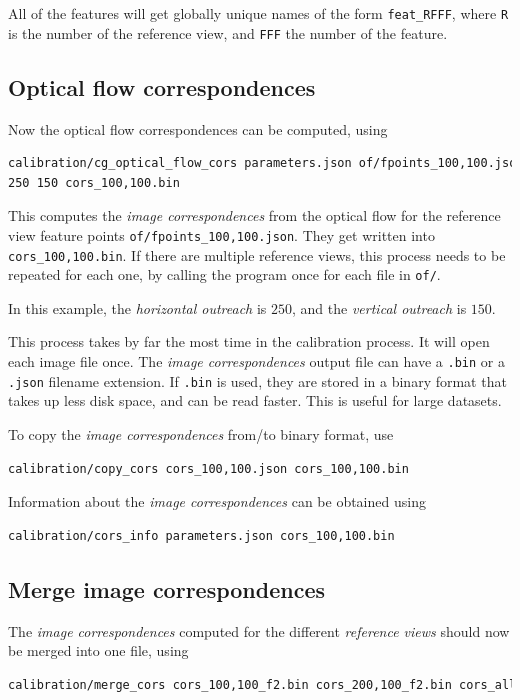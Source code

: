 \documentclass[11pt]{scrreprt}
\begin{document}
All of the features will get globally unique names of the form \texttt{feat\_RFFF}, where \texttt{R} is the number of the reference view, and \texttt{FFF} the number of the feature.

\subsection{Optical flow correspondences}
Now the optical flow correspondences can be computed, using
\begin{lstlisting}[language=bash]
calibration/cg_optical_flow_cors parameters.json of/fpoints_100,100.json
250 150 cors_100,100.bin
\end{lstlisting}
This computes the \emph{image correspondences} from the optical flow for the reference view feature points \texttt{of/fpoints\_100,100.json}. They get written into \texttt{cors\_100,100.bin}. If there are multiple reference views, this process needs to be repeated for each one, by calling the program once for each file in \texttt{of/}.

In this example, the \emph{horizontal outreach} is $250$, and the \emph{vertical outreach} is $150$.

This process takes by far the most time in the calibration process. It will open each image file once. The \emph{image correspondences} output file can have a \texttt{.bin} or a \texttt{.json} filename extension. If \texttt{.bin} is used, they are stored in a binary format that takes up less disk space, and can be read faster. This is useful for large datasets.

\noindent To copy the \emph{image correspondences} from/to binary format, use
\begin{lstlisting}[language=bash]
calibration/copy_cors cors_100,100.json cors_100,100.bin
\end{lstlisting}

\noindent Information about the \emph{image correspondences} can be obtained using
\begin{lstlisting}[language=bash]
calibration/cors_info parameters.json cors_100,100.bin
\end{lstlisting}

\subsection{Merge image correspondences}
The \emph{image correspondences} computed for the different \emph{reference views} should now be merged into one file, using
\begin{lstlisting}[language=bash]
calibration/merge_cors cors_100,100_f2.bin cors_200,100_f2.bin cors_all.bin
\end{lstlisting}
\end{document}
